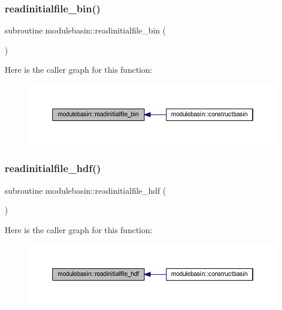 \subsubsection{\texorpdfstring{readinitialfile\+\_\+bin()}{readinitialfile\_bin()}}
{\footnotesize\ttfamily subroutine modulebasin\+::readinitialfile\+\_\+bin (\begin{DoxyParamCaption}{ }\end{DoxyParamCaption})\hspace{0.3cm}{\ttfamily [private]}}

Here is the caller graph for this function\+:\nopagebreak
\begin{figure}[H]
\begin{center}
\leavevmode
\includegraphics[width=350pt]{namespacemodulebasin_a4ea226fec981510a8e050dbe3bc285ab_icgraph}
\end{center}
\end{figure}
\mbox{\label{namespacemodulebasin_a52545eff06912899ced860eb99799977}} 
\subsubsection{\texorpdfstring{readinitialfile\+\_\+hdf()}{readinitialfile\_hdf()}}
{\footnotesize\ttfamily subroutine modulebasin\+::readinitialfile\+\_\+hdf (\begin{DoxyParamCaption}{ }\end{DoxyParamCaption})\hspace{0.3cm}{\ttfamily [private]}}

Here is the caller graph for this function\+:\nopagebreak
\begin{figure}[H]
\begin{center}
\leavevmode
\includegraphics[width=350pt]{namespacemodulebasin_a52545eff06912899ced860eb99799977_icgraph}
\end{center}
\end{figure}
\mbox{\label{namespacemodulebasin_adebce1a3581c733f01c10813a94c4dea}} 
